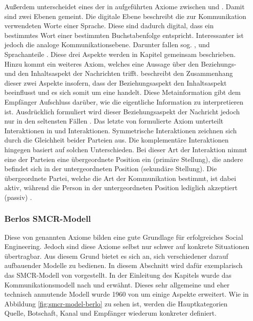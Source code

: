 Außerdem unterscheidet eines der in \citep[S. 56]{watzlawick} aufgeführten Axiome zwischen  und . Damit sind zwei Ebenen gemeint.
Die digitale Ebene beschreibt die zur Kommunikation verwendeten Worte einer Sprache.
Diese sind dadurch digital, dass ein bestimmtes Wort einer bestimmten Buchstabenfolge entspricht.
Interessanter ist jedoch die analoge Kommunikationsebene.
Darunter fallen sog. ,  und  Sprachanteile \citep{grundlagen-der-kommunikation}.
Diese drei Aspekte werden in Kapitel  gemeinsam beschrieben.
Hinzu kommt ein weiteres Axiom, welches eine Aussage über den Beziehungs- und den Inhaltsaspekt \citep{watzlawick} der Nachrichten trifft.
 beschreibt den Zusammenhang dieser zwei Aspekte insofern, dass der Beziehungsaspekt den Inhaltsaspekt beeinflusst und es sich somit um eine  handelt.
Diese Metainformation gibt dem Empfänger Aufschluss darüber, wie die eigentliche Information zu interpretieren ist.
Ausdrücklich formuliert wird dieser Beziehungsaspekt der Nachricht jedoch nur in den seltensten Fällen \citep{grundlagen-der-kommunikation}.
Das letzte von \citep[S. 50ff]{watzlawick} formulierte Axiom unterteilt Interaktionen in  und  Interaktionen.
Symmetrische Interaktionen zeichnen sich durch die Gleichheit beider Parteien aus.
Die komplementäre Interaktionen hingegen basiert auf solchen Unterschieden.
Bei dieser Art der Interaktion nimmt eine der Parteien eine übergeordnete Position ein (primäre Stellung), die andere befindet sich in der untergeordneten Position (sekundäre Stellung).
Die übergeordnete Partei, welche die Art der Kommunikation bestimmt, ist dabei aktiv, während die Person in der untergeordneten Position lediglich akzeptiert (passiv) \citep{grundlagen-der-kommunikation}.


\subsubsection{Berlos SMCR-Modell}

Diese von  genannten Axiome bilden eine gute Grundlage für erfolgreiches Social Engineering.
Jedoch sind diese Axiome selbst nur schwer auf konkrete Situationen übertragbar.
Aus diesem Grund bietet es sich an, sich verschiedener darauf aufbauender Modelle zu bedienen.
In diesem Abschnitt wird dafür exemplarisch das SMCR-Modell von  vorgestellt.
In der Einleitung des Kapitels  wurde das Kommunikationsmodell nach  und  erwähnt.
Dieses sehr allgemeine und eher technisch anmutende Modell wurde 1960 von  um einige Aspekte erweitert.
Wie in Abbildung \ref{fig:smcr-model-berlo} zu sehen ist, werden die Hauptkategorien Quelle, Botschaft, Kanal und Empfänger wiederum konkreter definiert.

